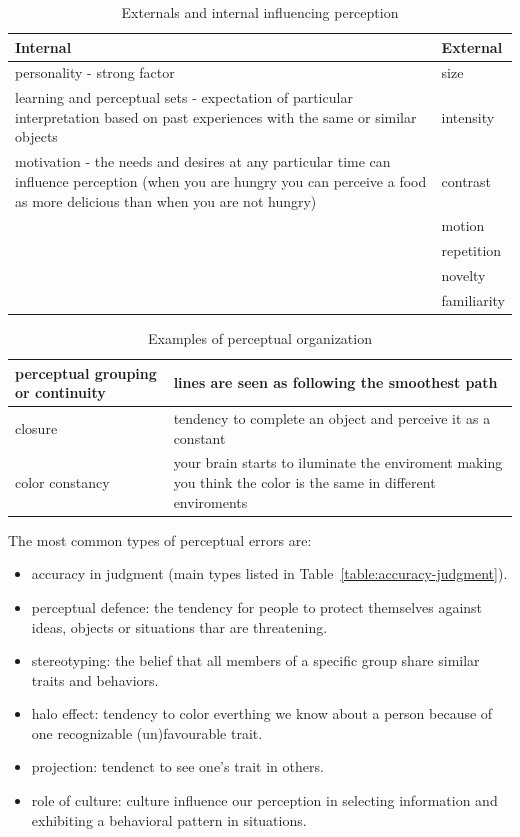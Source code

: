\documentclass[12pt,article,oneside,a4paper]{memoir}
\begin{document}
\begin{table}
  \begin{tabular}{ p{13cm} |  p{2cm} }
    \hline
    Internal & External \\ \hline
    personality -  strong factor & size \\ \hline
    learning and perceptual sets - expectation of particular interpretation
    based on past experiences with the same or similar objects & intensity
    \\ \hline
    motivation - the needs and desires at any particular time can influence
    perception (when you are hungry you can perceive a food as more delicious
    than when you are not hungry) & contrast \\ \hline
	 & motion \\ \hline
 	 & repetition \\ \hline
 	 & novelty \\ \hline
     & familiarity \\
    \hline
  \end{tabular}
  \caption{Externals and internal influencing perception}
  \label{table:factors-perception}
\end{table}

\begin{table}
  \begin{tabular}{ l |  p{10cm} }
    \hline
    perceptual grouping or continuity & lines are seen as following the
    smoothest path \\ \hline
    closure & tendency to complete an object and perceive it as a constant \\
    \hline
    color constancy & your brain starts to iluminate the enviroment making you
    think the color is the same in different enviroments \\
    \hline
  \end{tabular}
  \caption{Examples of perceptual organization}
  \label{table:perceptual-organization}
\end{table}

The most common types of perceptual errors are:
\begin{itemize}
\item accuracy in judgment (main types listed in
Table~\ref{table:accuracy-judgment}).
\item perceptual defence: the tendency for people to protect themselves against
ideas, objects or situations thar are threatening.
\item stereotyping: the belief that all members of a specific group share
similar traits and behaviors.
\item halo effect: tendency to color everthing we know about a person because
of one recognizable (un)favourable trait.
\item projection: tendenct to see one's trait in others.
\item role of culture: culture influence our perception in selecting
information and exhibiting a behavioral pattern in situations.
\end{itemize}
\end{document}

